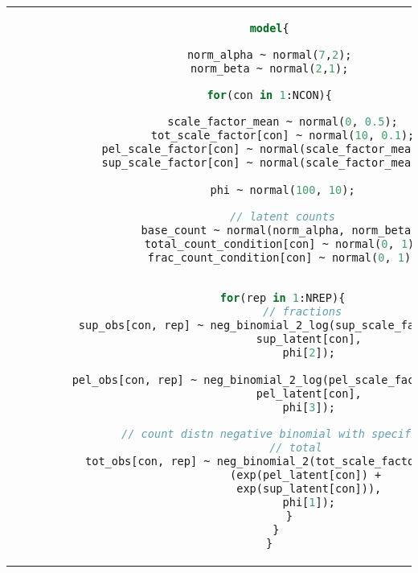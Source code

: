 \documentclass[../main.tex]{subfiles}
\begin{document}
\begin{table}
\begin{tabular}{c}
\begin{lstlisting}[style=mystyle,language=stan]
model{

norm_alpha ~ normal(7,2);
norm_beta ~ normal(2,1);

for(con in 1:NCON){

    scale_factor_mean ~ normal(0, 0.5);
    tot_scale_factor[con] ~ normal(10, 0.1);
    pel_scale_factor[con] ~ normal(scale_factor_mean, 0.1);
    sup_scale_factor[con] ~ normal(scale_factor_mean, 0.1);
   
    phi ~ normal(100, 10);

    // latent counts
    base_count ~ normal(norm_alpha, norm_beta);
    total_count_condition[con] ~ normal(0, 1);
    frac_count_condition[con] ~ normal(0, 1);
    

    for(rep in 1:NREP){
          // fractions
          sup_obs[con, rep] ~ neg_binomial_2_log(sup_scale_factor[con, rep] + 
            sup_latent[con],
            phi[2]);
                                              
        pel_obs[con, rep] ~ neg_binomial_2_log(pel_scale_factor[con, rep] + 
            pel_latent[con],
            phi[3]);

        // count distn negative binomial with specified means
        // total
        tot_obs[con, rep] ~ neg_binomial_2(tot_scale_factor[con, rep] * 
            (exp(pel_latent[con]) + 
            exp(sup_latent[con])),
            phi[1]);
      }
  }
}
\end{lstlisting} \\
\end{tabular}
\end{table}
\end{document}
